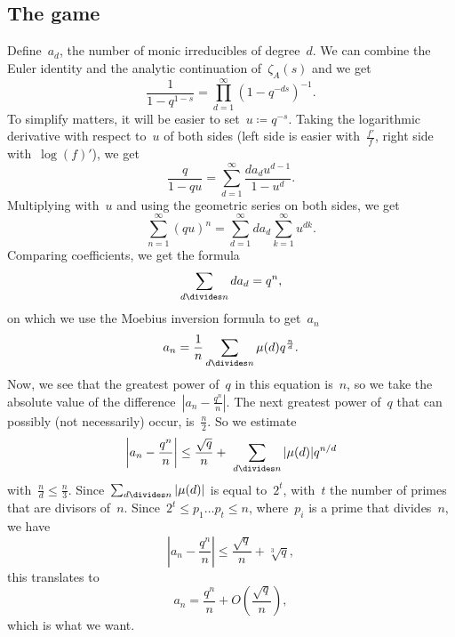 \subsection{The game}
Define~$a_d$, the number of monic irreducibles of degree~$d$. We can combine the Euler identity and the analytic continuation of~$\zeta_A(s)$ and we get
\begin{equation}
  \frac{1}{1-q^{1-s}} = \prod_{d=1}^{\infty}(1-q^{-ds})^{-1}.
\end{equation}
To simplify matters, it will be easier to set~$u\coloneqq q^{-s}$. Taking the logarithmic derivative with respect to~$u$ of both sides (left side is easier with~$\frac{f'}{f}$, right side with~$\log(f)'$), we get
\begin{equation}
  \frac{q}{1-qu} = \sum_{d=1}^\infty \frac{d a_d u^{d-1}}{1-u^d}.
\end{equation}
Multiplying with~$u$ and using the geometric series on both sides, we get
\begin{equation}
  \sum_{n=1}^\infty (qu)^n = \sum_{d=1}^\infty d a_d \sum_{k=1}^\infty u^{dk} .
\end{equation}
Comparing coefficients, we get the formula
\begin{equation}
  \sum_{d\divides n} d a_d = q^n, 
\end{equation}
on which we use the Moebius inversion formula to get~$a_n$
\begin{equation}
  a_n = \frac{1}{n} \sum_{d\divides n} \mu(d)q^{\frac{n}{d}}.
\end{equation}
Now, we see that the greatest power of~$q$ in this equation is~$n$, so we take the absolute value of the difference~$|a_n - \frac{q^n}{n}|$. The next greatest power of~$q$ that can possibly (not necessarily) occur, is~$\frac{n}{2}$. So we estimate
\begin{equation}
  \left| a_n - \frac{q^n}{n} \right| \leq \frac{\sqrt{q}}{n} +  \sum_{d\divides n} |\mu(d)| q^{n/d} 
\end{equation}
with~$\frac{n}{d} \leq \frac{n}{3}$. Since~$\sum_{d\divides n} |\mu(d)|$ is equal to~$2^t$, with~$t$ the number of primes that are divisors of~$n$. Since~$2^t \leq p_1 \ldots p_t \leq n$, where~$p_i$ is a prime that divides~$n$, we have
\begin{equation}
  \left| a_n - \frac{q^n}{n} \right| \leq \frac{\sqrt{q}}{n} + \sqrt[3]{q}, 
\end{equation}
this translates to
\begin{equation}
  a_n = \frac{q^n}{n} + O\left( \frac{\sqrt{q}}{n} \right), 
\end{equation}
which is what we want.
